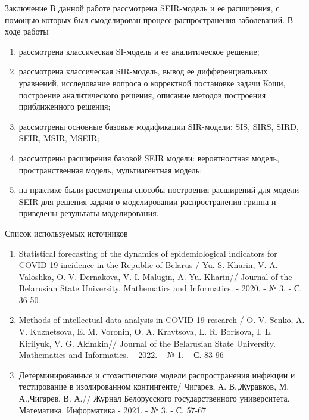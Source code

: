 \documentclass[notheorems]{beamer}
\begin{document}
\begin{frame}
	{Заключение}
	В данной работе рассмотрена SEIR-модель и ее расширения, с помощью которых был смоделирован процесс распространения заболеваний.
	В ходе работы
	\begin{enumerate}
		\item рассмотрена классическая SI-модель и ее аналитическое решение;
		\item рассмотрена классическая SIR-модель, вывод ее дифференциальных уравнений, исследование вопроса о корректной постановке задачи Коши, построение аналитического решения, описание методов построения приближенного решения;
		\item рассмотрены основные базовые модификации SIR-модели: SIS, SIRS, SIRD, SEIR, MSIR, MSEIR;
		\item рассмотрены расширения базовой SEIR модели: вероятностная модель, пространственная модель, мультиагентная модель;
		\item на практике были рассмотрены способы построения расширений для модели SEIR для решения задачи о моделировании распространения гриппа и приведены результаты моделирования.
	\end{enumerate}
\end{frame}


\begin{frame}
	{Список используемых источников}
	\begin{enumerate}
		\item Statistical forecasting of the dynamics of epidemiological indicators for COVID-19 incidence in the Republic of Belarus / Yu. S. Kharin, V. A. Valoshka, O. V. Dernakova, V. I. Malugin, A. Yu. Kharin// Journal of the Belarusian State University. Mathematics and Informatics. - 2020. - № 3. - С. 36-50
		\item Methods of intellectual data analysis in COVID-19 research / O. V. Senko, A. V. Kuznetsova, E. M. Voronin, O. A. Kravtsova, L. R. Borisova, I. L. Kirilyuk, V. G. Akimkin// Journal of the Belarusian State University. Mathematics and Informatics. – 2022. – № 1. – С. 83-96
		\item Детерминированные и стохастические модели распространения инфекции и тестирование в изолированном контингенте/ Чигарев, А. В.,Журавков, М. А.,Чигарев, В. А.// Журнал Белорусского государственного университета. Математика. Информатика - 2021. - № 3. - С. 57-67
	\end{enumerate}
\end{frame}

\end{document}
